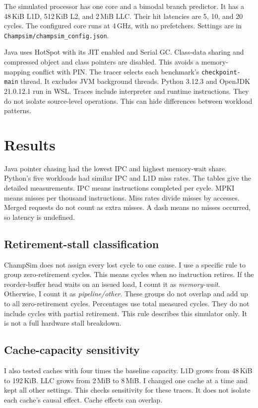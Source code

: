 \documentclass[11pt]{article}
\begin{document}
The simulated processor has one core and a bimodal branch predictor. It has a
48\,KiB L1D, 512\,KiB L2, and 2\,MiB LLC. Their hit latencies are 5, 10, and
20 cycles. The configured core runs at 4\,GHz, with no prefetchers. Settings
are in \texttt{Champsim/champsim\_config.json}.

Java uses HotSpot with its JIT enabled and Serial GC. Class-data sharing and
compressed object and class pointers are disabled. This avoids a memory-mapping
conflict with PIN. The tracer selects each benchmark's
\texttt{checkpoint-main} thread. It excludes JVM background threads. Python
3.12.3 and OpenJDK 21.0.12.1 run in WSL. Traces include interpreter and runtime
instructions. They do not isolate source-level operations. This can hide
differences between workload patterns.

\section{Results}
Java pointer chasing had the lowest IPC and highest memory-wait share. Python's
five workloads had similar IPC and L1D miss rates. The tables give the detailed
measurements. IPC means instructions completed per cycle. MPKI means misses
per thousand instructions. Miss rates divide misses by accesses. Merged
requests do not count as extra misses. A dash means no misses occurred, so
latency is undefined.




\subsection{Retirement-stall classification}
ChampSim does not assign every lost cycle to one cause. I use a specific rule
to group zero-retirement cycles. This means cycles when no instruction retires.
If the reorder-buffer head waits on an issued load, I count it as
\emph{memory-wait}. Otherwise, I count it as \emph{pipeline/other}. These
groups do not overlap and add up to all zero-retirement cycles. Percentages
use total measured cycles. They do not include cycles with partial retirement.
This rule describes this simulator only. It is not a full hardware stall
breakdown.



\subsection{Cache-capacity sensitivity}
I also tested caches with four times the baseline capacity. L1D grows from
48\,KiB to 192\,KiB. LLC grows from 2\,MiB to 8\,MiB. I changed one cache at a
time and kept all other settings. This checks sensitivity for these traces.
It does not isolate each cache's causal effect. Cache effects can overlap.
\end{document}
